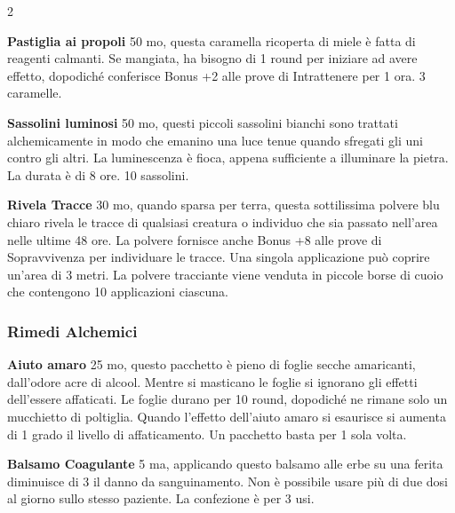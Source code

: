 \begin{multicols}{2}

\textbf{Pastiglia ai propoli} 50 mo, questa caramella ricoperta di miele è fatta di reagenti calmanti. Se mangiata, ha bisogno di 1 round per iniziare ad avere effetto, dopodiché conferisce Bonus +2 alle prove di Intrattenere per 1 ora. 3 caramelle.

\textbf{Sassolini luminosi} 50 mo, questi piccoli sassolini bianchi sono trattati alchemicamente in modo che emanino una luce tenue quando sfregati gli uni contro gli altri. La luminescenza è fioca, appena sufficiente a illuminare la pietra. La durata è di 8 ore. 10 sassolini.

\textbf{Rivela Tracce} 30 mo, quando sparsa per terra, questa sottilissima polvere blu chiaro rivela le tracce di qualsiasi creatura o individuo che sia passato nell'area nelle ultime 48 ore.
La polvere fornisce anche Bonus +8 alle prove di Sopravvivenza per individuare le tracce. Una singola applicazione può coprire un'area di 3 metri. La polvere tracciante viene venduta in piccole borse di cuoio che contengono 10 applicazioni ciascuna.

\subsubsection{Rimedi Alchemici}

\label{rimedi-alchemici}

\textbf{Aiuto amaro} 25 mo, questo pacchetto è pieno di foglie secche amaricanti, dall'odore acre di alcool. Mentre si masticano le foglie si ignorano gli effetti dell'essere affaticati. Le foglie durano per 10 round, dopodiché ne rimane solo un mucchietto di poltiglia.
Quando l'effetto dell'aiuto amaro si esaurisce si aumenta di 1 grado il livello di affaticamento. Un pacchetto basta per 1 sola volta.


\textbf{Balsamo Coagulante} 5 ma, applicando questo balsamo alle erbe su una ferita diminuisce di 3 il danno da sanguinamento. Non è possibile usare più di due dosi al giorno sullo stesso paziente. La confezione è per 3 usi.


\end{multicols}
